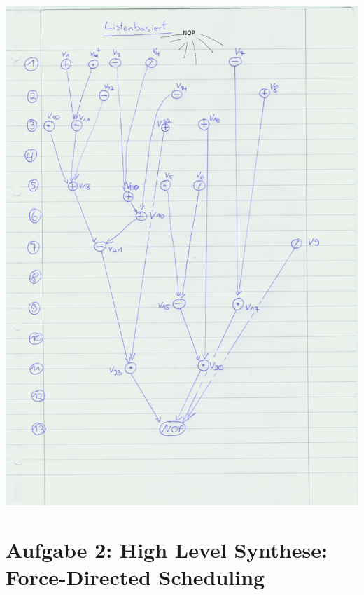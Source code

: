 \documentclass[a4paper]{scrartcl}
\begin{document}
\begin{enumerate}[(a)]
	\includegraphics[scale=0.8]{Image131}
	
\end{enumerate}

\section*{Aufgabe 2: High Level Synthese: Force-Directed Scheduling}
\end{document}
